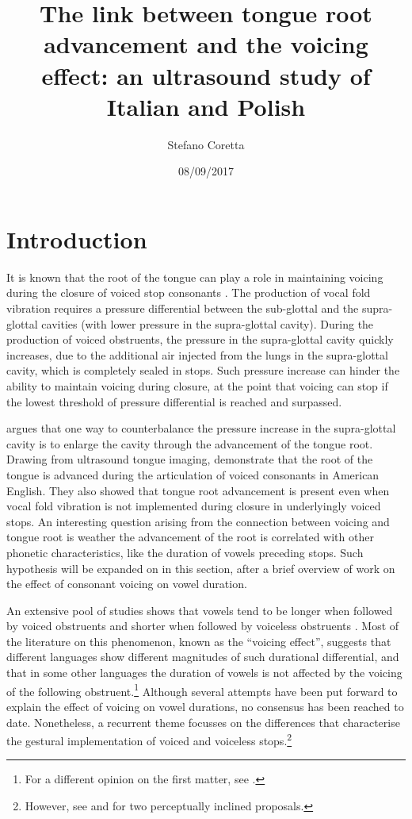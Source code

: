 \documentclass[authoryear, twocolumn]{elsarticle}
\author[mcr]{Stefano Coretta\corref{cor1}}
\title{The link between tongue root advancement and the voicing effect: an
ultrasound study of Italian and Polish}
\date{08/09/2017}
\begin{document}
\maketitle

\section{Introduction}\label{introduction}

It is known that the root of the tongue can play a role in maintaining
voicing during the closure of voiced stop consonants
\citep{halle1967,kent1969,perkell1969,westbury1983}. The production of
vocal fold vibration requires a pressure differential between the
sub-glottal and the supra-glottal cavities (with lower pressure in the
supra-glottal cavity). During the production of voiced obstruents, the
pressure in the supra-glottal cavity quickly increases, due to the
additional air injected from the lungs in the supra-glottal cavity,
which is completely sealed in stops. Such pressure increase can hinder
the ability to maintain voicing during closure, at the point that
voicing can stop if the lowest threshold of pressure differential is
reached and surpassed.

\citet{westbury1983} argues that one way to counterbalance the pressure
increase in the supra-glottal cavity is to enlarge the cavity through
the advancement of the tongue root. Drawing from ultrasound tongue
imaging, \citet{ahn2016} demonstrate that the root of the tongue is
advanced during the articulation of voiced consonants in American
English. They also showed that tongue root advancement is present even
when vocal fold vibration is not implemented during closure in
underlyingly voiced stops. An interesting question arising from the
connection between voicing and tongue root is weather the advancement of
the root is correlated with other phonetic characteristics, like the
duration of vowels preceding stops. Such hypothesis will be expanded on
in this section, after a brief overview of work on the effect of
consonant voicing on vowel duration.

An extensive pool of studies shows that vowels tend to be longer when
followed by voiced obstruents and shorter when followed by voiceless
obstruents \citep[just to mention a
few]{house1953, chen1970, klatt1973, lisker1973}. Most of the literature
on this phenomenon, known as the ``voicing effect'', suggests that
different languages show different magnitudes of such durational
differential, and that in some other languages the duration of vowels is
not affected by the voicing of the following
obstruent.\footnote{For a different opinion on the first matter, see \citet{laeufer1992}.}
Although several attempts have been put forward to explain the effect of
voicing on vowel durations, no consensus has been reached to date.
Nonetheless, a recurrent theme focusses on the differences that
characterise the gestural implementation of voiced and voiceless
stops.\footnote{However, see \citet{javkin1976} and \citet{kluender1988} for two perceptually inclined proposals.}
\end{document}
